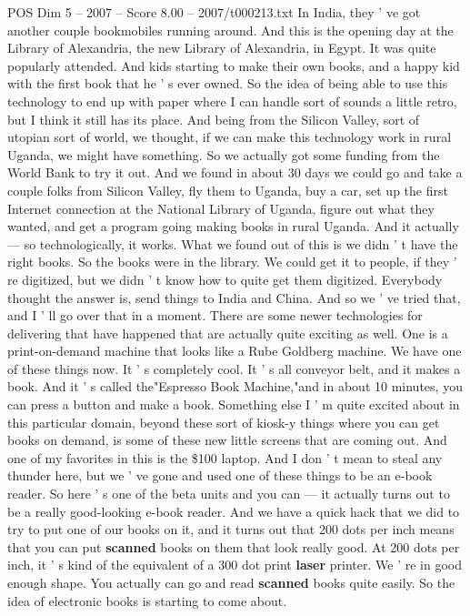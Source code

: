 \begin{textsample}{POS Dim 5 – 2007 – Score 8.00 – 2007/t000213.txt}
In India, they ' ve got another couple bookmobiles running around.
And this is the opening day at the Library of Alexandria, the new Library of Alexandria, in Egypt.
It was quite popularly attended.
And kids starting to make their own books, and a happy kid with the first book that he ' s ever owned.
So the idea of being able to use this technology to end up with paper where I can handle sort of sounds a little retro, but I think it still has its place.
And being from the Silicon Valley, sort of utopian sort of world, we thought, if we can make this technology work in rural Uganda, we might have something.
So we actually got some funding from the World Bank to try it out.
And we found in about 30 days we could go and take a couple folks from Silicon Valley, fly them to Uganda, buy a car, set up the first Internet connection at the National Library of Uganda, figure out what they wanted, and get a program going making books in rural Uganda.
And it actually — so technologically, it works.
What we found out of this is we didn ' t have the right books.
So the books were in the library.
We could get it to people, if they ' re digitized, but we didn ' t know how to quite get them digitized.
Everybody thought the answer is, send things to India and China.
And so we ' ve tried that, and I ' ll go over that in a moment.
There are some newer technologies for delivering that have happened that are actually quite exciting as well.
One is a print-on-demand machine that looks like a Rube Goldberg machine.
We have one of these things now.
It ' s completely cool.
It ' s all conveyor belt, and it makes a book.
And it ' s called the"Espresso Book Machine,"and in about 10 minutes, you can press a button and make a book.
Something else I ' m quite excited about in this particular domain, beyond these sort of kiosk-y things where you can get books on demand, is some of these new little screens that are coming out.
And one of my favorites in this is the \$100 laptop.
And I don ' t mean to steal any thunder here, but we ' ve gone and used one of these things to be an e-book reader.
So here ' s one of the beta units and you can — it actually turns out to be a really good-looking e-book reader.
And we have a quick hack that we did to try to put one of our books on it, and it turns out that 200 dots per inch means that you can put \textbf{scanned} books on them that look really good.
At 200 dots per inch, it ' s kind of the equivalent of a 300 dot print \textbf{laser} printer.
We ' re in good enough shape.
You actually can go and read \textbf{scanned} books quite easily.
So the idea of electronic books is starting to come about.

\end{textsample}
